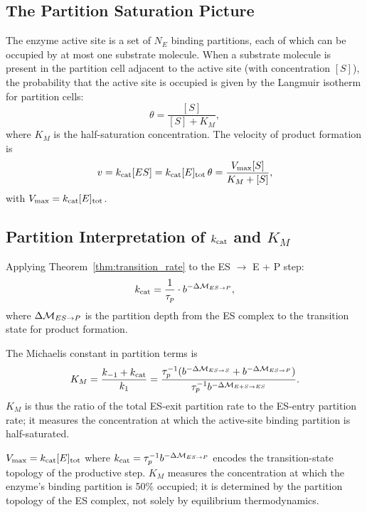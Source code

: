 \subsection{The Partition Saturation Picture}
\label{ssec:saturation}

The enzyme active site is a set of $N_E$ binding partitions, each of which
can be occupied by at most one substrate molecule. When a substrate molecule
is present in the partition cell adjacent to the active site (with
concentration $[S]$), the probability that the active site is occupied is
given by the Langmuir isotherm for partition cells:
\begin{equation}
  \theta = \frac{[S]}{[S] + K_M},
  \label{eq:langmuir}
\end{equation}
where $K_M$ is the half-saturation concentration. The velocity of product
formation is
\begin{equation}
  v = k_{\mathrm{cat}} [ES] = k_{\mathrm{cat}} [E]_{\mathrm{tot}} \, \theta
    = \frac{V_{\max}[S]}{K_M + [S]},
  \label{eq:michaelis_menten}
\end{equation}
with $V_{\max} = k_{\mathrm{cat}} [E]_{\mathrm{tot}}$.

\subsection{Partition Interpretation of $k_{\mathrm{cat}}$ and $K_M$}
\label{ssec:kcat_km}

Applying Theorem~\ref{thm:transition_rate} to the ES $\to$ E + P step:
\begin{equation}
  k_{\mathrm{cat}} = \frac{1}{\tau_p} \cdot b^{-\Delta\mathcal{M}_{ES \to P}},
  \label{eq:kcat_partition}
\end{equation}
where $\Delta\mathcal{M}_{ES \to P}$ is the partition depth from the ES complex
to the transition state for product formation.

The Michaelis constant in partition terms is
\begin{equation}
  K_M = \frac{k_{-1} + k_{\mathrm{cat}}}{k_1}
      = \frac{\tau_p^{-1}(b^{-\Delta\mathcal{M}_{ES \to S}} + b^{-\Delta\mathcal{M}_{ES \to P}})}
             {\tau_p^{-1} b^{-\Delta\mathcal{M}_{E+S \to ES}}}.
  \label{eq:km_partition}
\end{equation}
$K_M$ is thus the ratio of the total ES-exit partition rate to the
ES-entry partition rate; it measures the concentration at which the
active-site binding partition is half-saturated.

\begin{keyresult}
$V_{\max} = k_{\mathrm{cat}}[E]_{\mathrm{tot}}$ where $k_{\mathrm{cat}} = \tau_p^{-1} b^{-\Delta\mathcal{M}_{ES \to P}}$
encodes the transition-state topology of the productive step.
$K_M$ measures the concentration at which the enzyme's binding partition
is 50\% occupied; it is determined by the partition topology of the
ES complex, not solely by equilibrium thermodynamics.
\end{keyresult}


